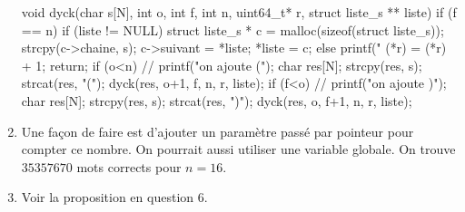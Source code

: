 \documentclass{ccinp}
\begin{document}
\begin{enumerate}
\begin{ccode}
  void dyck(char s[N], int o, int f, int n, uint64_t* r,
            struct liste_s ** liste) {
    if (f == n) {
        if (liste != NULL) {
            struct liste_s * c = malloc(sizeof(struct liste_s));
            strcpy(c->chaine, s);
            c->suivant = *liste;
            *liste = c;
        }
        else {
            printf("%
        }
        (*r) = (*r) + 1;
        return;
    }
    if (o<n) {
        // printf("on ajoute (\n");
        char res[N];
        strcpy(res, s);
        strcat(res, "(");
        dyck(res, o+1, f, n, r, liste);
    }
    if (f<o) {
        // printf("on ajoute )\n");
        char res[N];
        strcpy(res, s);
        strcat(res, ")");
        dyck(res, o, f+1, n, r, liste);
    }
  }
\end{ccode}

\item Une façon de faire est d'ajouter un paramètre passé par pointeur pour compter ce nombre. On pourrait aussi utiliser une variable globale. On trouve $35357670$ mots corrects pour $n = 16$.
\item Voir la proposition en question 6.
\end{enumerate}
\end{document}
